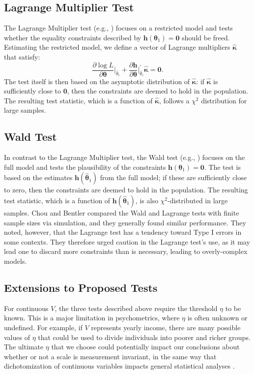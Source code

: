 \documentclass[man]{apa}
\begin{document}
\subsection{Lagrange Multiplier Test}
The Lagrange Multiplier test (e.g., )
focuses on a restricted model and tests whether the equality
constraints described by ${\bm h}({\bm \theta}_1) = {\bm 0}$ should be
freed.
Estimating the restricted model, we define a vector of Lagrange
multipliers $\widehat{\bm \kappa}$ that satisfy:
\begin{equation}
    \label{eq:lagrange}
    \frac{\partial \log L}{\partial {\bm \theta}} \bigg |_{\widehat{\theta}_c} +
    \frac{\partial {\bm h}}{\partial {\bm \theta}}
    \bigg |_{\widehat{\theta}_c}^{\prime} \widehat{{\bm \kappa}} = {\bm 0}.
\end{equation}
The test itself is then based on the asymptotic distribution of 
$\widehat{{\bm \kappa}}$: if $\widehat{{\bm \kappa}}$ is sufficiently close
to ${\bm 0}$, then the constraints are deemed to hold in the
population.  The resulting test statistic, which is a function of
$\widehat{\bm \kappa}$, follows a $\chi^2$ distribution for large
samples.

\subsection{Wald Test}
In contrast to the Lagrange Multiplier test, the
Wald test (e.g., )
focuses on the full model and tests the plausibility of the
constraints ${\bm h}({\bm \theta}_1) = {\bm 0}$.
The test is based on the estimates ${\bm h}(\widehat{{\bm \theta}}_1)$
from the full model; if
these are sufficiently close to zero, then the constraints are deemed
to hold in the population.  The resulting test statistic, which is a
function of ${\bm h}(\widehat{{\bm \theta}}_1)$, is also
$\chi^2$-distributed in large 
samples.
Chou and Bentler \citeyear{ChouBent90} compared the 
Wald and Lagrange tests with finite sample sizes via
simulation, and they generally found similar
performance.  They noted, 
however, that the Lagrange test has a tendency toward Type I errors in
some contexts.  They therefore urged caution in the Lagrange test's
use, as it may lead one to discard more constraints than is necessary,
leading to overly-complex models.

\subsection{Extensions to Proposed Tests}
For continuous $V$, the three tests described above require the
threshold $\eta$ to be known.
  This is a
major limitation in psychometrics, where $\eta$ is often unknown or
undefined.
For example, if $V$ represents yearly income, there are many possible
values of 
$\eta$ that could be used to divide individuals into poorer and richer
groups.  The ultimate $\eta$ that we
choose could potentially impact our
conclusions about whether or not a scale is measurement invariant, 
in the same way that dichotomization of continuous variables impacts
general statistical analyses \cite{MacZha02}.
\end{document}
